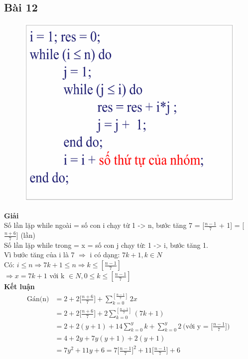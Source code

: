 \documentclass[10pt,a4paper]{article}
\begin{document}
\subsection*{Bài 12} %
    \begin{figure}[H]
        \centering\includegraphics[scale=.6]{images/bai12.png} \\
    \end{figure}
    \textbf{Giải} \\
    Số lần lặp while ngoài = số con i chạy từ 1 -> n, bước tăng 7 = [$\frac{n-1}{7}$ + 1] = [$\frac{n+6}{7}$] (lần) \\
    Số lần lặp while trong = x = số con j chạy từ: 1 -> i, bước tăng 1. \\
    Vì bước tăng của i là 7 $\Rightarrow$ i có dạng: $7k+1, k \in N$ \\
    Có: $i \leq n \Rightarrow 7k+1 \leq n \Rightarrow k \leq [\frac{n-1}{7}]$ \\
    $\Rightarrow x = 7k+1$ với k $\in N, 0 \leq k \leq [\frac{n-1}{7}]$\\
    \textbf{Kết luận}
    \begin{align*}
        \text{Gán(n)}
        & = 2 + 2\big[\frac{n+6}{7}\big] + \sum_{k=0}^{[\frac{n-1}{7}]}{2x} \\
        & = 2 + 2\big[\frac{n+6}{7}\big] + 2\sum_{k=0}^{[\frac{n-1}{7}]}{(7k+1)}\\
        & = 2 + 2(y+1) + 14\sum_{k=0}^{y}{k} + \sum_{k=0}^{y}{2} \
        \text{(với y = $\big[\frac{n-1}{7}\big]$) } \\
        & = 4 + 2y + 7y(y+1) + 2(y+1) \\
        & = 7y^2 + 11y + 6 = 7\big[\frac{n-1}{7}\big]^2 + 11\big[\frac{n-1}{7}\big] + 6
    \end{align*}
\end{document}
